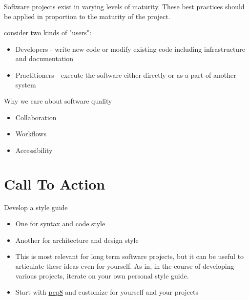 \documentclass[]{nrel}
\begin{document}
Software projects exist in varying levels of maturity.
These best practices should be applied in proportion to the maturity of the project.

consider two kinds of "users":
\begin{itemize}
\item Developers - write new code or modify existing code including infrastructure and documentation

\item Practitioners - execute the software either directly or as a part of another system

\end{itemize}

Why we care about software quality
\begin{itemize}
\item Collaboration

\item Workflows

\item Accessibility

\end{itemize}


\chapter{Call To Action}
\label{\detokenize{best_practices:call-to-action}}
Develop a style guide
\begin{itemize}
\item One for syntax and code style

\item Another for architecture and design style

\item This is most relevant for long term software projects, but it can be useful to articulate
these ideas even for yourself. As in, in the course of developing various projects, iterate
on your own personal style guide.

\item Start with \href{https://pep8.org}{pep8} and customize for yourself and your projects

\end{itemize}
\end{document}
